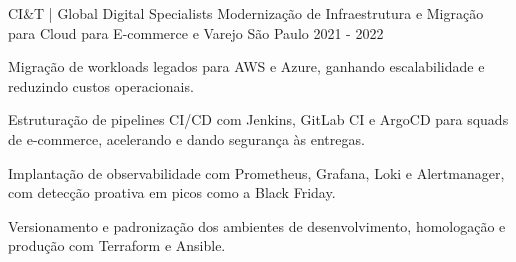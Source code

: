 \begin{cventries}
  \cventry
    {CI\&T | Global Digital Specialists} %
    {Modernização de Infraestrutura e Migração para Cloud para E-commerce e Varejo} %
    {São Paulo} %
    {2021 - 2022} %
    {
      \begin{cvitems} %
        \item {Migração de workloads legados para AWS e Azure, ganhando escalabilidade e reduzindo custos operacionais.}
        \item {Estruturação de pipelines CI/CD com Jenkins, GitLab CI e ArgoCD para squads de e-commerce, acelerando e dando segurança às entregas.}
        \item {Implantação de observabilidade com Prometheus, Grafana, Loki e Alertmanager, com detecção proativa em picos como a Black Friday.}
        \item {Versionamento e padronização dos ambientes de desenvolvimento, homologação e produção com Terraform e Ansible.}
      \end{cvitems}
    }
  \break

\end{cventries}
